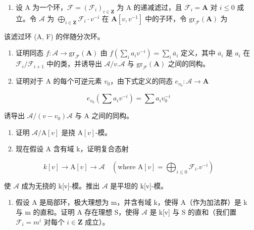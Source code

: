 \begin{enumerate}
\def\labelenumi{\arabic{enumi})}
\setcounter{enumi}{1}
\tightlist
\item
  设 A 为一个环，\(\mathcal{F} = (\mathcal{F}_i)_{i \in \mathbf{Z}}\) 为 A 的递减滤过，且 \(\mathcal{F}_i = \mathbf{A}\) 对 \(i \leqslant 0\) 成立。令 \(\mathcal{A}\) 为 \(\bigoplus_{i \in \mathbf{Z}} \mathcal{F}_i \cdot v^{-i}\) 在 \(\mathbf{A}[v, v^{-1}]\) 中的子环，令 \(\mathrm{gr}_{\mathcal{F}}(\mathbf{A})\) 为
\end{enumerate}

该滤过环 (A, F) 的伴随分次环。

\begin{enumerate}
\def\labelenumi{\alph{enumi})}
\item
  证明同态 \(f: \mathcal{A} \to \mathrm{gr}_{\mathcal{F}}(\mathbf{A})\) 由 \(f\left(\sum_{i} a_i v^{-i}\right) = \sum_{i} \overline{a}_i\) 定义，其中 \(\overline{a}_i\) 是 \(a_i\) 在 \(\mathcal{F}_i / \mathcal{F}_{i+1}\) 中的类，并诱导出 \(\mathcal{A}/v. \mathcal{A}\) 与 \(\mathrm{gr}_{\mathcal{F}}(\mathbf{A})\) 之间的同构。
\item
  证明对于 A 的每个可逆元素 \(v_{0}\)，由下式定义的同态 \(e_{v_{0}}: \mathcal{A} \to \mathbf{A}\)
\end{enumerate}

\[
e _ {v _ {0}} (\sum a _ {i} v ^ {- i}) = \sum a _ {i} v _ {0} ^ {- i}
\]

诱导出 \(\mathcal{A}/(v - v_{0})\mathcal{A}\) 与 A 之间的同构。

\begin{enumerate}
\def\labelenumi{\alph{enumi})}
\setcounter{enumi}{2}
\item
  证明 \(\mathcal{A}/\mathrm{A}[v]\) 是挠 \(\mathrm{A}[v]\)-模。
\item
  现在假设 A 含有域 k，证明复合态射
\end{enumerate}

\[
k [ v ] \rightarrow \mathrm{A} [ v ] \rightarrow \mathcal {A} \quad (\text {where } \mathrm{A} [ v ] = \bigoplus_ {i \leqslant 0} \mathcal {F} _ {i}. v ^ {- i})
\]

使 \(\mathcal{A}\) 成为无挠的 k{[}v{]}-模。推出 \(\mathcal{A}\) 是平坦的 k{[}v{]}-模。

\begin{enumerate}
\def\labelenumi{\alph{enumi})}
\setcounter{enumi}{4}
\tightlist
\item
  假设 A 是局部环，极大理想为 m，并含有域 k，使得 A（作为加法群）是 k 与 m 的直和。证明 A 存在理想 S，使得 \(\mathcal{A}\) 是 k{[}v{]} 与 S 的直和（我们置 \(\mathcal{F}_{i} = m^{i}\) 对每个 \(i \in \mathbf{Z}\) 成立）。
\end{enumerate}

